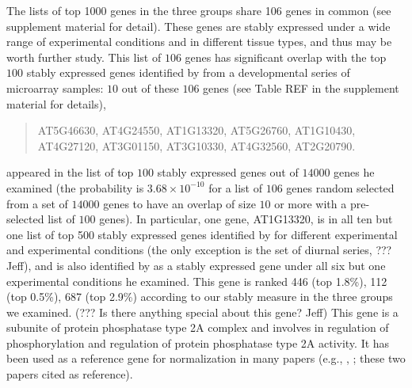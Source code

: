 \documentclass[11pt, a4paper]{article}
\begin{document}

The lists of top 1000 genes in the three groups share 106 genes in common (see supplement material for detail).  These
genes are stably expressed under a wide range of experimental conditions and
in different tissue types, and thus may be worth further study. This list of
$106$ genes has significant overlap with the top $100$ stably expressed genes
identified by \cite{czechowski2005genome} from a developmental series of
microarray samples: $10$ out of these $106$ genes (see Table REF in the
supplement material for details),
\begin{center}
\begin{quote}
	AT5G46630, AT4G24550, AT1G13320, AT5G26760, AT1G10430, \\
	AT4G27120, AT3G01150, AT3G10330, AT4G32560, AT2G20790.
\end{quote}
\end{center}
appeared in the list of top $100$ stably expressed genes
out of $14000$ genes he examined (the probability is $3.68\times10^{-10}$ for
a list of $106$ genes random selected from a set of $14000$ genes to have an
overlap of size $10$ or more with a pre-selected list of $100$ genes). In
particular, one gene, AT1G13320, is in all ten but one list of top 500 stably
expressed genes identified by \cite{czechowski2005genome} for different
experimental and experimental conditions (the only exception is the set of
diurnal series, ??? Jeff), and is also identified by
\cite{hong2010identification} as a stably expressed gene under all six but one
experimental conditions he examined.  This gene is ranked 446 (top 1.8\%), 112
(top 0.5\%), 687 (top 2.9\%) according to our stably measure in the three
groups we examined.  (??? Is there anything special about this gene? Jeff)
This gene is a subunite of protein phosphatase type 2A complex and involves in
regulation of phosphorylation and regulation of protein phosphatase type 2A
activity. It has been used as a reference gene for normalization in many
papers (e.g., \cite{bournier2013arabidopsis}, \cite{baron2012transcriptional};
these two papers cited \cite{czechowski2005genome} as reference). 

\end{document}
